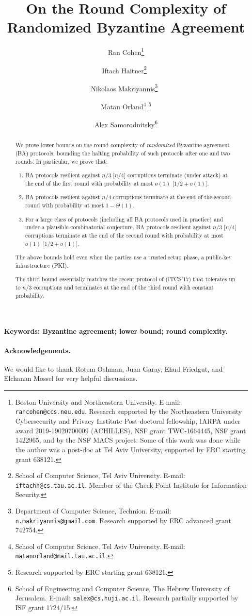 \documentclass[11pt]{article}
\title{On the Round Complexity of Randomized Byzantine Agreement
\Draft{\\{\small \sc Working Draft: Please Do Not Distribute}}
}
\author{Ran Cohen\thanks{Boston University and Northeastern University. E-mail: \texttt{rancohen@ccs.neu.edu}. Research supported by the Northeastern University Cybersecurity and Privacy Institute Post-doctoral fellowship, IARPA under award 2019-19020700009 (ACHILLES), NSF grant TWC-1664445, NSF grant 1422965, and by the NSF MACS project. Some of this work was done while the author was a post-doc at Tel Aviv University, supported by ERC starting grant 638121.}
\and Iftach Haitner\thanks{School of Computer Science, Tel Aviv University. E-mail: \texttt{iftachh@cs.tau.ac.il}. Member of the Check Point Institute for Information Security.}~\footnotemark[5] %
\and Nikolaos Makriyannis\thanks{Department of Computer Science, Technion. E-mail: \texttt{n.makriyannis@gmail.com}. Research supported by ERC advanced grant 742754.}~\footnotemark[5]
\and Matan Orland\thanks{School of Computer Science, Tel Aviv University. E-mail: \texttt{matanorland@mail.tau.ac.il}.}
\footnote{Research supported by ERC starting grant 638121.}
\and Alex Samorodnitsky\thanks{School of Engineering and Computer Science, The Hebrew University of Jerusalem.\newline{} E-mail: \texttt{salex@cs.huji.ac.il}. Research partially supported by ISF grant 1724/15.}
}
\begin{document}
\sloppy
\maketitle
\begin{abstract}
We prove lower bounds on the round complexity of \emph{randomized} Byzantine agreement (BA) protocols,
bounding the halting probability of such protocols after one and two rounds. In particular, we prove that:

\begin{enumerate}
\item BA protocols resilient against $n/3$ [\resp $n/4$] corruptions terminate (under attack) at the end of the first round with probability at most $o(1)$ [\resp $1/2+ o(1)$].

\item BA protocols resilient against $n/4$ corruptions terminate at the end of the second round with probability at most $1-\Theta(1)$.

\item For a large class of protocols (including all BA protocols used in practice) and under a plausible combinatorial conjecture, BA protocols resilient against $n/3$ [\resp $n/4$] corruptions terminate at the end of the second round with probability at most $o(1)$ [\resp $1/2 + o(1)$].
\end{enumerate}
The above bounds hold even when the parties use a trusted setup phase, \eg a public-key infrastructure (PKI).

The third bound essentially matches the recent protocol of \citeauthor{Micali17} (ITCS'17) that tolerates up to $n/3$ corruptions and terminates at the end of the third round with constant probability.
\end{abstract}

\vfill
\noindent\textbf{Keywords: Byzantine agreement; lower bound; round complexity.}

\Tableofcontents










\paragraph{Acknowledgements.}
We would like to thank Rotem Oshman, Juan Garay, Ehud Friedgut, and Elchanan Mossel for very helpful discussions.




\appendix

\end{document}
